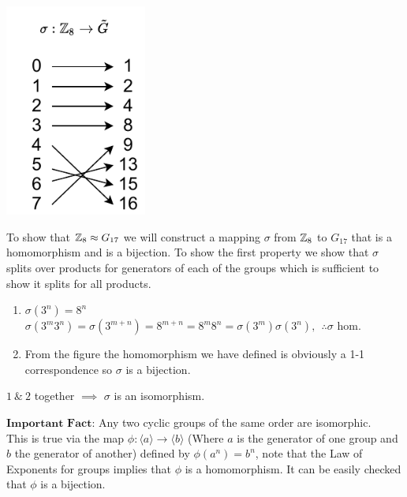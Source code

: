 \begin{multicols}{2} %
        \includegraphics[width=0.35\textwidth]{Figures/iso_example_Z8_G17.pdf} 
        
        To show that ${\mathbb{ Z}}_8 \approx G_{17}$ we will construct a mapping $\sigma$ from ${\mathbb{ Z}}_8$ to $G_{17}$ that is a homomorphism and is a bijection. To show the first property we show that $\sigma$ splits over products for generators of each of the groups which is sufficient to show it splits for all products. 
        \begin{enumerate}
            \item $\sigma(3^n)=8^n$\\
            $\sigma(3^m 3^n)= \sigma(3^{m+n})=8^{m+n}=8^m8^n=\sigma(3^m)\sigma(3^n), \ \ \therefore \sigma $ hom.
            \item From the figure the homomorphism we have defined is obviously a 1-1 correspondence so $\sigma$ is a bijection. %
        \end{enumerate}
        $1 \ \& \ 2$ together $\implies $ $\sigma$ is an isomorphism.
\end{multicols}

\noindent$\boxed{\textbf{Important Fact:}}$ Any two cyclic groups of the same order are isomorphic.\\
This is true via the map $\phi: \langle a\rangle \rightarrow \langle b \rangle $ (Where $a$ is the generator of one group and $b$ the generator of another) defined by $\phi(a^n)=b^n$, note that the Law of Exponents for groups implies that $\phi$ is a homomorphism. It can be easily checked that $\phi$ is a bijection. \steezybreak\\

